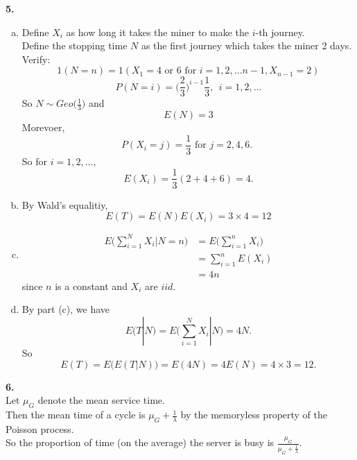 \documentclass{amsart}
\theoremstyle{plain}
\theoremstyle{definition}
\begin{document}
\vspace{5mm}

\noindent \textbf{5.} 
\begin{enumerate}[(a)]
	\item
		Define $X_i$ as how long it takes the miner to make the $i$-th journey. \\
		Define the stopping time $N$ as the first journey which takes the miner 2 days.\\ 
		Verify: 
		\[1(N=n) = 1(X_1 = 4\text{ or }6 \text{ for } i = 1,2,...n-1, X_{n-1} = 2)	\]		 
		\[P(N=i) = \Big({\frac{2}{3}}\Big)^{i-1}\frac{1}{3},\ \ i = 1,2,...\]
		So $N\sim Geo\Big(\frac{1}{3}\Big)$ and  
		\[E(N) = 3\]
		Morevoer,
		\[ P(X_i = j) = \frac{1}{3}\text{ for $j=2,4,6$. } \]
		So for $i=1,2,...,$
		\[E(X_i) = \frac{1}{3}(2+4+6) = 4.\]
	\item
		By Wald's equalitiy,
		\[ E(T)  = E(N)E(X_i) = 3\times 4 = 12\]
	\item
		\begin{align*}
			E\Bigg(\sum_{i=1}^NX_i|N=n\Bigg) &= E\Bigg(\sum_{i=1}^nX_i\Bigg )\\
											 &=\sum_{i=1}^nE(X_i)\\
											 &=4n
		\end{align*}
		since $n$ is a constant and $X_i$ are $iid$.\\
	\item
		By part (c), we have 
		\[E(T|N) = E\Bigg(\sum_{i=1}^NX_i|N\Bigg) =4N.\]
		So
		\[ E(T)= E\big(E(T|N)\big) = E(4N) = 4E(N) = 4\times 3 = 12. \]
\end{enumerate}

\vspace{5mm}

\noindent \textbf{6.} \\
Let $\mu_G$ denote the mean service time.\\
Then the mean time of a cycle is $\mu_G + \frac{1}{\lambda}$ by the memoryless property of the Poisson process.\\
So the proportion of time (on the average) the server is busy is $\frac{\mu_G}{\mu_G + \frac{1}{\lambda}}$.
\end{document}
